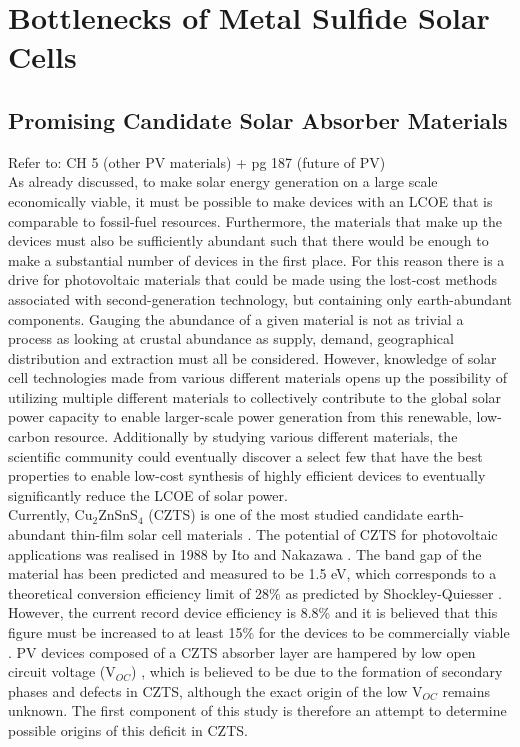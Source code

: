 \chapter{Bottlenecks of Metal Sulfide Solar Cells}

\section{Promising Candidate Solar Absorber Materials}
Refer to: CH 5 (other PV materials) + pg 187 (future of PV) \cite{PV_Goetzberger}\\

As already discussed, to make solar energy generation on a large scale economically viable, it must be possible to make devices with an LCOE that is comparable to fossil-fuel resources. Furthermore, the materials that make up the devices must also be sufficiently abundant such that there would be enough to make a substantial number of devices in the first place. For this reason there is a drive for photovoltaic materials that could be made using the lost-cost methods associated with second-generation technology, but containing only earth-abundant components. Gauging the abundance of a given material is not as trivial a process as looking at crustal abundance as supply, demand, geographical distribution and extraction must all be considered. However, knowledge of solar cell technologies made from various different materials opens up the possibility of utilizing multiple different materials to collectively contribute to the global solar power capacity to enable larger-scale power generation from this renewable, low-carbon resource. Additionally by studying various different materials, the scientific community could eventually discover a select few that have the best properties to enable low-cost synthesis of highly efficient devices to eventually significantly reduce the LCOE of solar power.\\

Currently, Cu$_2$ZnSnS$_4$ (CZTS) is one of the most studied candidate earth-abundant thin-film solar cell materials \cite{CZTS_vs_MAPI}. The potential of CZTS for photovoltaic applications was realised in 1988 by Ito and Nakazawa \cite{first_CZTS}. The band gap of the material has been predicted \cite{CZTS_bandgap_theory} and measured \cite{CZTS_bandgap_exp} to be 1.5 eV, which corresponds to a theoretical conversion efficiency limit of 28\% as predicted by Shockley-Quiesser \cite{SQ_1961}. However, the current record device efficiency is 8.8\% \cite{CZTS_record} and it is believed that this figure must be increased to at least 15\% for the devices to be commercially viable \cite{SS}. PV devices composed of a CZTS absorber layer are hampered by low open circuit voltage (V$_{OC}$) \cite{SS}, which is believed to be due to the formation of secondary phases \cite{CZTS_phases} and defects \cite{CZTS_defects} in CZTS, although the exact origin of the low V$_{OC}$ remains unknown. The first component of this study is therefore an attempt to determine possible origins of this deficit in CZTS.\\

